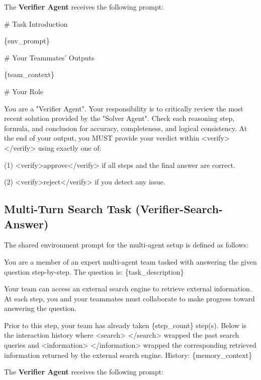 \documentclass[]{fairmeta}
\theoremstyle{plain}
\theoremstyle{definition}
\theoremstyle{remark}
\begin{document}
The \textbf{Verifier Agent} receives the following prompt:

\begin{promptbox}[title=Verifier Agent Prompt]
\# Task Introduction

\{env\_prompt\}

\# Your Teammates' Outputs

\{team\_context\}

\# Your Role

You are a "Verifier Agent". Your responsibility is to critically review the most recent solution provided by the "Solver Agent". Check each reasoning step, formula, and conclusion for accuracy, completeness, and logical consistency.
At the end of your output, you MUST provide your verdict within <verify> </verify> using exactly one of:

(1) <verify>approve</verify> if all steps and the final answer are correct.

(2) <verify>reject</verify> if you detect any issue.
\end{promptbox}


\subsection{Multi-Turn Search Task (Verifier-Search-Answer)}
The shared environment prompt for the multi-agent setup is defined as follows:

\begin{promptbox}[title=Environment Prompt]
You are a member of an expert multi-agent team tasked with answering the given question step-by-step.
The question is: \{task\_description\}

Your team can access an external search engine to retrieve external information. At each step, you and your teammates must collaborate to make progress toward answering the question.

Prior to this step, your team has already taken \{step\_count\} step(s). Below is the interaction history where <search> </search> wrapped the past search queries and <information> </information> wrapped the corresponding retrieved information returned by the external search engine. History:
\{memory\_context\}
\end{promptbox}

The \textbf{Verifier Agent} receives the following prompt:
\end{document}
